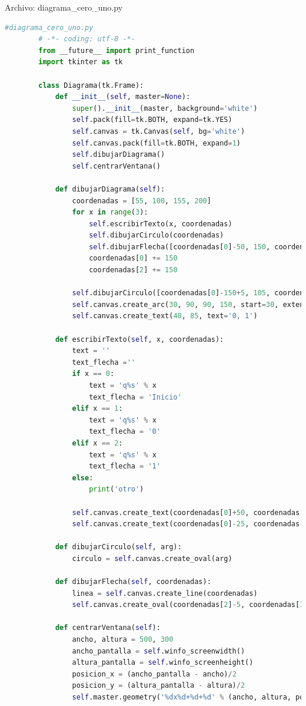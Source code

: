 		Archivo: diagrama\_cero\_uno.py
		\begin{lstlisting}[language=Python]
		#diagrama_cero_uno.py
		# -*- coding: utf-8 -*-
		from __future__ import print_function
		import tkinter as tk
		
		class Diagrama(tk.Frame):
			def __init__(self, master=None):
				super().__init__(master, background='white')
				self.pack(fill=tk.BOTH, expand=tk.YES)
				self.canvas = tk.Canvas(self, bg='white')
				self.canvas.pack(fill=tk.BOTH, expand=1)
				self.dibujarDiagrama()
				self.centrarVentana()
			
			def dibujarDiagrama(self):
				coordenadas = [55, 100, 155, 200]
				for x in range(3):
					self.escribirTexto(x, coordenadas)
					self.dibujarCirculo(coordenadas)
					self.dibujarFlecha([coordenadas[0]-50, 150, coordenadas[2]-100, 150])
					coordenadas[0] += 150
					coordenadas[2] += 150
				
				self.dibujarCirculo([coordenadas[0]-150+5, 105, coordenadas[2]-155, 195]) # circulo interior
				self.canvas.create_arc(30, 90, 90, 150, start=30, extent=235, style='arc')
				self.canvas.create_text(40, 85, text='0, 1')
			
			def escribirTexto(self, x, coordenadas):
				text = ''
				text_flecha =''
				if x == 0:
					text = 'q%s' % x
					text_flecha = 'Inicio'
				elif x == 1:
					text = 'q%s' % x
					text_flecha = '0'
				elif x == 2:
					text = 'q%s' % x
					text_flecha = '1'
				else:
					print('otro')
				
				self.canvas.create_text(coordenadas[0]+50, coordenadas[1]+50, font=('15'), text=text)
				self.canvas.create_text(coordenadas[0]-25, coordenadas[1]+40, text=text_flecha)
			
			def dibujarCirculo(self, arg):
				circulo = self.canvas.create_oval(arg)
			
			def dibujarFlecha(self, coordenadas):
				linea = self.canvas.create_line(coordenadas)
				self.canvas.create_oval(coordenadas[2]-5, coordenadas[1]-5, coordenadas[2]+5,coordenadas[1]+5, fill = 'black')
			
			def centrarVentana(self):
				ancho, altura = 500, 300
				ancho_pantalla = self.winfo_screenwidth()
				altura_pantalla = self.winfo_screenheight()
				posicion_x = (ancho_pantalla - ancho)/2
				posicion_y = (altura_pantalla - altura)/2
				self.master.geometry('%dx%d+%d+%d' % (ancho, altura, posicion_x, posicion_y))
		
		\end{lstlisting}
	\newpage
